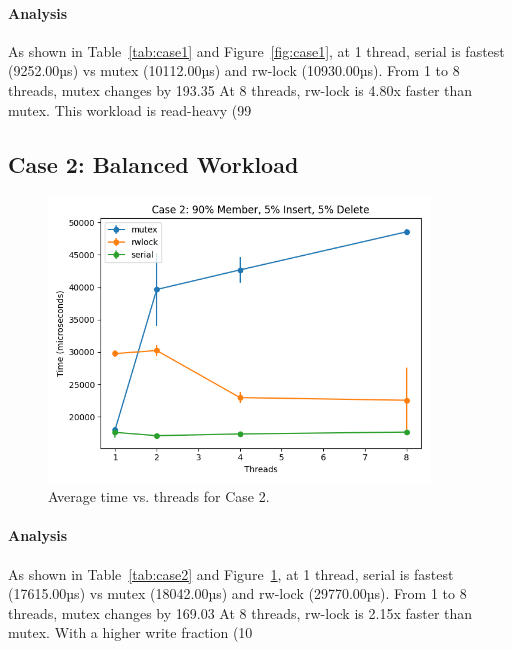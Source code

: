 \documentclass{article}
\begin{document}
\paragraph{Analysis}
As shown in Table~\ref{tab:case1} and Figure~\ref{fig:case1}, at 1 thread, serial is fastest (9252.00µs) vs mutex (10112.00µs) and rw-lock (10930.00µs).
From 1 to 8 threads, mutex changes by 193.35%
At 8 threads, rw-lock is 4.80x faster than mutex.
This workload is read-heavy (99%
\newpage
\subsection*{Case 2: Balanced Workload}
\begin{figure}[h!]
\centering
\includegraphics[width=0.9\textwidth]{report/graphs/case2_plot.png}
\caption{Average time vs. threads for Case 2.}
\label{fig:case2}
\end{figure}
\paragraph{Analysis}
As shown in Table~\ref{tab:case2} and Figure~\ref{fig:case2}, at 1 thread, serial is fastest (17615.00µs) vs mutex (18042.00µs) and rw-lock (29770.00µs).
From 1 to 8 threads, mutex changes by 169.03%
At 8 threads, rw-lock is 2.15x faster than mutex.
With a higher write fraction (10%
\newpage
\end{document}
